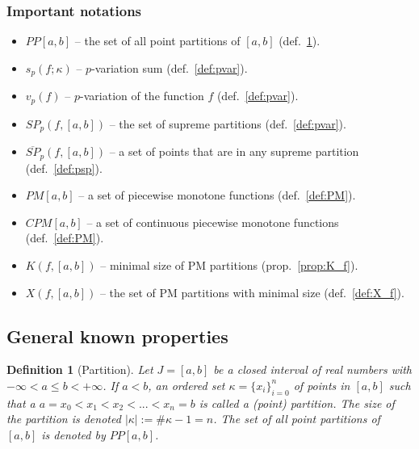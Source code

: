 \documentclass[12pt, a4paper]{article}
\newtheorem{definition}[theorem]{Definition}
\numberwithin{equation}{section}
\begin{document}
\subsubsection*{Important notations}
\begin{itemize}  
  \item $PP[a,b]$ --  the set of all point partitions of $[a,b]$
    (def.~\ref{def:pp}).
  \item $s_{p}(f;\kappa)$ --  $p$-variation sum (def.~\ref{def:pvar}).
  \item $v_{p}\left( f\right)$ -- $p$-variation of the function $f$
    (def.~\ref{def:pvar}).
  \item $SP_{p}(f,[a,b])$ -- the set of supreme partitions
    (def.~\ref{def:pvar}).
  \item $\overline{SP}_{p}(f,[a,b])$ -- a set of points that are
    in any supreme partition (def.~\ref{def:psp}).
  \item $PM[a,b]$ -- a set of piecewise monotone functions
    (def.~\ref{def:PM}).  
  \item $CPM[a,b]$ -- a set of continuous piecewise monotone functions
    (def.~\ref{def:PM}).
  \item $K(f,[a,b])$ -- minimal size of PM partitions
    (prop.~\ref{prop:K_f}).
  \item $X(f,[a,b])$ -- the set of PM partitions with minimal size
    (def.~\ref{def:X_f}).
\end{itemize} 


\subsection{General known properties}
  
  
\begin{definition}[Partition]\label{def:pp}
  Let $J = [a,b]$ be a closed interval of real numbers with 
  $-\infty < a \leq b <+\infty$. 
  If $a < b$, an ordered set $\kappa = \{x_{i}\}_{i=0}^{n}$ 
  of points in $[a,b]$ such that a  
  $a=x_{0}<x_{1}<x_{2}<...<x_{n}=b$ is called a \emph{(point) partition}. 
  The size of the partition is denoted $\left|\kappa \right| :=\#\kappa-1=n$. 
  The set of all point partitions of $[a,b]$ is denoted by $PP[a,b]$.  
\end{definition} 
 
\end{document}
